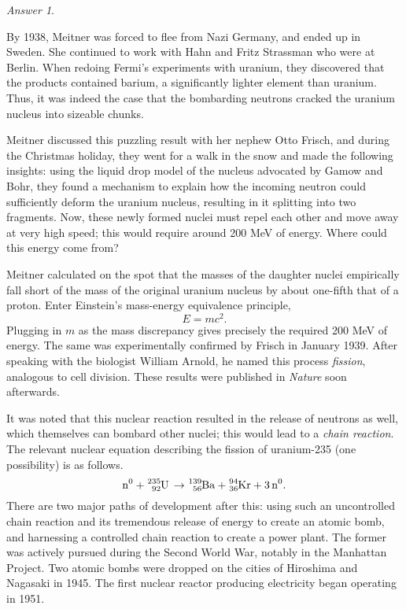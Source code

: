\documentclass[11pt]{article}
\theoremstyle{remark}
\newtheorem*{answer}{Answer}
\begin{document}
\begin{answer}
\begin{enumerate}
            By 1938, Meitner was forced to flee from Nazi Germany, and ended up in
            Sweden. She continued to work with Hahn and Fritz Strassman who were at
            Berlin. When redoing Fermi's experiments with uranium, they discovered
            that the products contained barium, a significantly lighter element than
            uranium. Thus, it was indeed the case that the bombarding neutrons
            cracked the uranium nucleus into sizeable chunks.

            Meitner discussed this puzzling result with her nephew Otto Frisch, and
            during the Christmas holiday, they went for a walk in the snow and made
            the following insights: using the liquid drop model of the nucleus
            advocated by Gamow and Bohr, they found a mechanism to explain how the
            incoming neutron could sufficiently deform the uranium nucleus, resulting
            in it splitting into two fragments. Now, these newly formed nuclei must
            repel each other and move away at very high speed; this would require
            around 200 MeV of energy. Where could this energy come from?

            Meitner calculated on the spot that the masses of the daughter nuclei
            empirically fall short of the mass of the original uranium nucleus by
            about one-fifth that of a proton. Enter Einstein's mass-energy
            equivalence principle, \[
                E = mc^2.
            \] Plugging in $m$ as the mass discrepancy gives precisely the required
            200 MeV of energy. The same was experimentally confirmed by Frisch in
            January 1939. After speaking with the biologist William Arnold, he named
            this process \emph{fission}, analogous to cell division. These results
            were published in \emph{Nature} soon afterwards.
        \end{enumerate}

        It was noted that this nuclear reaction resulted in the release of neutrons
        as well, which themselves can bombard other nuclei; this would lead to a
        \emph{chain reaction}. The relevant nuclear equation describing the fission
        of uranium-235 (one possibility) is as follows. \[
            \ce{n^0 + ^235_92U \to ^139_56Ba + ^94_36Kr + 3n^0}.
        \] There are two major paths of development after this: using such an
        uncontrolled chain reaction and its tremendous release of energy to create an
        atomic bomb, and harnessing a controlled chain reaction to create a power
        plant. The former was actively pursued during the Second World War, notably
        in the Manhattan Project. Two atomic bombs were dropped on the cities of
        Hiroshima and Nagasaki in 1945. The first nuclear reactor producing
        electricity began operating in 1951.

    \end{answer}
\end{document}
